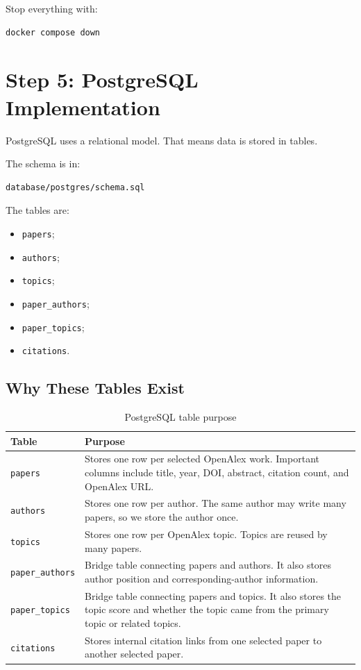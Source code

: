 \documentclass[11pt]{article}
\begin{document}
Stop everything with:

\begin{verbatim}
docker compose down
\end{verbatim}

\section{Step 5: PostgreSQL Implementation}

PostgreSQL uses a relational model.
That means data is stored in tables.

The schema is in:

\begin{verbatim}
database/postgres/schema.sql
\end{verbatim}

The tables are:

\begin{itemize}
    \item \texttt{papers};
    \item \texttt{authors};
    \item \texttt{topics};
    \item \texttt{paper\_authors};
    \item \texttt{paper\_topics};
    \item \texttt{citations}.
\end{itemize}

\subsection{Why These Tables Exist}

\begin{table}[H]
\centering
\small
\begin{tabular}{|p{}|p{}|}
\hline
\textbf{Table} & \textbf{Purpose} \\
\hline
\texttt{papers} & Stores one row per selected OpenAlex work. Important columns include title, year, DOI, abstract, citation count, and OpenAlex URL. \\
\hline
\texttt{authors} & Stores one row per author. The same author may write many papers, so we store the author once. \\
\hline
\texttt{topics} & Stores one row per OpenAlex topic. Topics are reused by many papers. \\
\hline
\texttt{paper\_authors} & Bridge table connecting papers and authors. It also stores author position and corresponding-author information. \\
\hline
\texttt{paper\_topics} & Bridge table connecting papers and topics. It also stores the topic score and whether the topic came from the primary topic or related topics. \\
\hline
\texttt{citations} & Stores internal citation links from one selected paper to another selected paper. \\
\hline
\end{tabular}
\caption{PostgreSQL table purpose}
\end{table}
\end{document}
